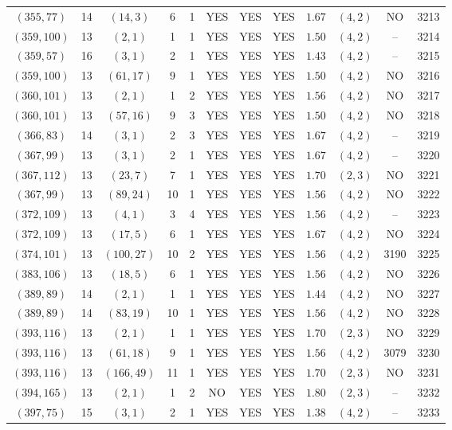 \begin{longtable}{|c|c|c|c|c|c|c|c|c|c|c|c|}
$(355,77)$ & 14 & $(14,3)$ & 6 & 1 & YES & YES & YES & $1.67$ & $(4,2)$ & NO & 3213\\
$(359,100)$ & 13 & $(2,1)$ & 1 & 1 & YES & YES & YES & $1.50$ & $(4,2)$ & -- & 3214\\
$(359,57)$ & 16 & $(3,1)$ & 2 & 1 & YES & YES & YES & $1.43$ & $(4,2)$ & -- & 3215\\
$(359,100)$ & 13 & $(61,17)$ & 9 & 1 & YES & YES & YES & $1.50$ & $(4,2)$ & NO & 3216\\
$(360,101)$ & 13 & $(2,1)$ & 1 & 2 & YES & YES & YES & $1.56$ & $(4,2)$ & NO & 3217\\
$(360,101)$ & 13 & $(57,16)$ & 9 & 3 & YES & YES & YES & $1.50$ & $(4,2)$ & NO & 3218\\
$(366,83)$ & 14 & $(3,1)$ & 2 & 3 & YES & YES & YES & $1.67$ & $(4,2)$ & -- & 3219\\
$(367,99)$ & 13 & $(3,1)$ & 2 & 1 & YES & YES & YES & $1.67$ & $(4,2)$ & -- & 3220\\
$(367,112)$ & 13 & $(23,7)$ & 7 & 1 & YES & YES & YES & $1.70$ & $(2,3)$ & NO & 3221\\
$(367,99)$ & 13 & $(89,24)$ & 10 & 1 & YES & YES & YES & $1.56$ & $(4,2)$ & NO & 3222\\
$(372,109)$ & 13 & $(4,1)$ & 3 & 4 & YES & YES & YES & $1.56$ & $(4,2)$ & -- & 3223\\
$(372,109)$ & 13 & $(17,5)$ & 6 & 1 & YES & YES & YES & $1.67$ & $(4,2)$ & NO & 3224\\
$(374,101)$ & 13 & $(100,27)$ & 10 & 2 & YES & YES & YES & $1.56$ & $(4,2)$ & 3190 & 3225\\
$(383,106)$ & 13 & $(18,5)$ & 6 & 1 & YES & YES & YES & $1.56$ & $(4,2)$ & NO & 3226\\
$(389,89)$ & 14 & $(2,1)$ & 1 & 1 & YES & YES & YES & $1.44$ & $(4,2)$ & NO & 3227\\
$(389,89)$ & 14 & $(83,19)$ & 10 & 1 & YES & YES & YES & $1.56$ & $(4,2)$ & NO & 3228\\
$(393,116)$ & 13 & $(2,1)$ & 1 & 1 & YES & YES & YES & $1.70$ & $(2,3)$ & NO & 3229\\
$(393,116)$ & 13 & $(61,18)$ & 9 & 1 & YES & YES & YES & $1.56$ & $(4,2)$ & 3079 & 3230\\
$(393,116)$ & 13 & $(166,49)$ & 11 & 1 & YES & YES & YES & $1.70$ & $(2,3)$ & NO & 3231\\
$(394,165)$ & 13 & $(2,1)$ & 1 & 2 & NO & YES & YES & $1.80$ & $(2,3)$ & -- & 3232\\
$(397,75)$ & 15 & $(3,1)$ & 2 & 1 & YES & YES & YES & $1.38$ & $(4,2)$ & -- & 3233\\

\end{longtable}
